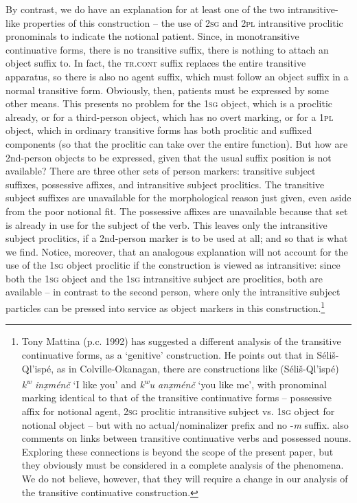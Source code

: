 \documentclass[output=paper,colorlinks,citecolor=brown]{langscibook}
\begin{document}
By contrast, we do have an explanation for at least one of the two
intransitive-like properties of this construction -- the use of \textsc{2sg} and
\textsc{2pl} intransitive proclitic pronominals to indicate the notional
patient.  Since, in monotransitive continuative forms, there is no
transitive suffix, there is nothing to attach an object suffix to.  In
fact, the \textsc{tr.cont} suffix replaces the entire transitive
apparatus, so there is also no agent suffix, which must follow an
object suffix in a normal transitive form.  Obviously, then, patients
must be expressed by some other means.  This presents no problem for
the \textsc{1sg} object, which is a proclitic already, or for a third-person
object, which has no overt marking, or for a \textsc{1pl} object, which in
ordinary transitive forms has both proclitic and suffixed components
(so that the proclitic can take over the entire function).  But how
are 2nd-person objects to be expressed, given that the usual suffix
position is not available?  There are three other sets of person
markers: transitive subject suffixes, possessive affixes, and
intransitive subject proclitics.  The transitive subject suffixes are
unavailable for the morphological reason just given, even aside from
the poor notional fit.  The possessive affixes are unavailable because
that set is already in use for the subject of the verb.  This leaves
only the intransitive subject proclitics, if a 2nd-person marker is to
be used at all; and so that is what we find.  Notice, moreover, that
an analogous explanation will not account for the use of the \textsc{1sg}
object proclitic if the construction is viewed as intransitive: since
both the \textsc{1sg} object and the \textsc{1sg} intransitive subject are proclitics,
both are available -- in contrast to the second person, where only the
intransitive subject particles can be pressed into service as object
markers in this construction.\footnote{Tony Mattina (p.c. 1992) has
suggested a different analysis of the transitive continuative forms,
as a `genitive' construction.  He points out that in
S\'eli\v{s}-Ql'isp\'e, as in Colville-Okanagan, there are
constructions like (S\'eli\v{s}-Ql'isp\'e) \emph{{k\textsuperscript w}
in\d{x}m\'en\v{c}} `I like you' and \emph{{k\textsuperscript w}u
an\d{x}m\'en\v{c}} `you like me', with pronominal marking identical to
that of the transitive continuative forms -- possessive affix for
notional agent, \textsc{2sg} proclitic intransitive subject vs. \textsc{1sg} object for
notional object -- but with no actual/nominalizer prefix and no
-\emph{m} suffix.  \citet[32]{Vogt:1940} also comments on links
between transitive continuative verbs and possessed nouns.  Exploring
these connections is beyond the scope of the present paper, but they
obviously must be considered in a complete analysis of the phenomena.
We do not believe, however, that they will require a change in our
analysis of the transitive continuative construction.  }
\end{document}
